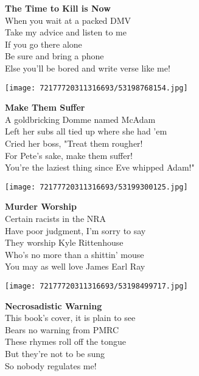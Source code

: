 \documentclass[10pt,letterpaper]{article}
\begin{document}
\begin{center}
\textbf{The Time to Kill is Now}\\
\vskip 0.2in
When you wait at a packed DMV\\
Take my advice and listen to me\\
If you go there alone\\
Be sure and bring a phone\\
Else you'll be bored and write verse like me!\\
\end{center}
\pagebreak

\begin{center}
\texttt{[image: 72177720311316693/53198768154.jpg]}
\end{center}

\begin{center}
\textbf{Make Them Suffer}\\
\vskip 0.2in
A goldbricking Domme named McAdam\\
Left her subs all tied up where she had 'em\\
Cried her boss, "Treat them rougher!\\
For Pete's sake, make them suffer!\\
You're the laziest thing since Eve whipped Adam!"\\
\end{center}
\pagebreak

\begin{center}
\texttt{[image: 72177720311316693/53199300125.jpg]}
\end{center}

\begin{center}
\textbf{Murder Worship}\\
\vskip 0.2in
Certain racists in the NRA\\
Have poor judgment, I'm sorry to say\\
They worship Kyle Rittenhouse\\
Who's no more than a shittin' mouse\\
You may as well love James Earl Ray\\
\end{center}
\pagebreak

\begin{center}\texttt{[image: 72177720311316693/53198499717.jpg]}
\end{center}
\begin{center}
\textbf{Necrosadistic Warning}\\
\vskip 0.2in
This book's cover, it is plain to see\\
Bears no warning from PMRC\\
These rhymes roll off the tongue\\
But they're not to be sung\\
So nobody regulates me!\\
\end{center}
\pagebreak
\end{document}
